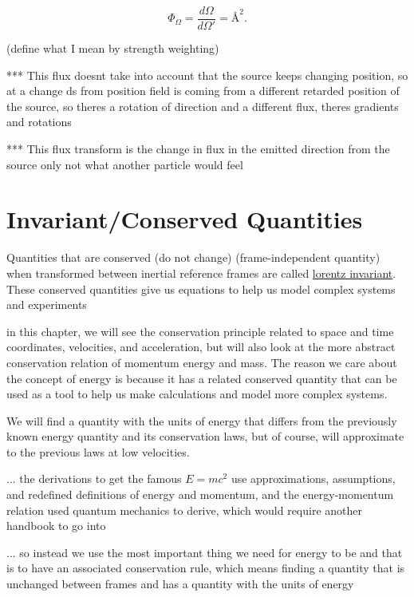 \begin{equation}
	\label{eq: aberrational wavefront weighting}
	\Phi_\Omega = \frac{d\Omega}{d\Omega'} = \text{\AA}^2.
\end{equation}

(define what I mean by strength weighting)

*** This flux doesnt take into account that the source keeps changing position, so at a change ds from position field is coming from a different retarded position of the source, so theres a rotation of direction and a different flux, theres gradients and rotations

*** This flux transform is the change in flux in the emitted direction from the source only not what another particle would feel

\chapter{Invariant/Conserved Quantities}

Quantities that are conserved (do not change) (frame-independent quantity) when transformed between inertial reference frames are called \hyperlink{def-lorentz-invariant}{lorentz invariant}. These conserved quantities give us equations to help us model complex systems and experiments

in this chapter, we will see the conservation principle related to space and time coordinates, velocities, and acceleration, but will also look at the more abstract conservation relation of momentum energy and mass. The reason we care about the concept of energy is because it has a related conserved quantity that can be used as a tool to help us make calculations and model more complex systems.

We will find a quantity with the units of energy that differs from the previously known energy quantity and its conservation laws, but of course, will approximate to the previous laws at low velocities.

... the derivations to get the famous $E=mc^2$ use approximations, assumptions, and redefined definitions of energy and momentum, and the energy-momentum relation used quantum mechanics to derive, which would require another handbook to go into

... so instead we use the most important thing we need for energy to be and that is to have an associated conservation rule, which means finding a quantity that is unchanged between frames and has a quantity with the units of energy

